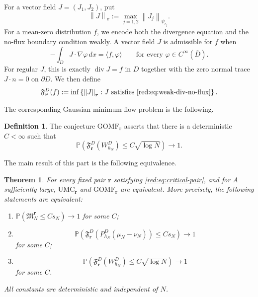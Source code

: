 \documentclass[11pt]{article}
\newtheorem{theorem}{Theorem}[section]
\theoremstyle{definition}
\newtheorem{definition}[definition]{Definition}
\theoremstyle{remark}
\numberwithin{equation}{section}
\newcommand{\Pp}{\mathbb P}
\newcommand{\divv}{\operatorname{div}}
\newcommand{\norm}[1]{\left\|#1\right\|}
\newcommand{\set}[1]{\left\{#1\right\}}
\newcommand{\pa}[1]{\left(#1\right)}
\begin{document}
For a vector field $J=(J_1,J_2)$, put
\begin{equation}
 \norm J_{\boldsymbol r}
 :=\max_{j=1,2}\norm{J_j}_{\psi_{r_j}}.
 \label{red:eq:product-flow-norm}
\end{equation}
For a mean-zero distribution $f$, we encode both the divergence equation
and the no-flux boundary condition weakly.  A vector field $J$ is admissible
for $f$ when
\begin{equation}
 -\int_D J\cdot\nabla\varphi\,dx=\langle f,\varphi\rangle
 \qquad\text{for every }\varphi\in C^\infty(\overline D).
 \label{red:eq:weak-div-no-flux}
\end{equation}
For regular $J$, this is exactly $\divv J=f$ in $D$ together with the zero
normal trace $J\cdot n=0$ on $\partial D$.  We then define
\begin{equation}
 \mathfrak F_{\boldsymbol r}^{D}(f)
 :=\inf\set{\norm J_{\boldsymbol r}: J\text{ satisfies }
 \eqref{red:eq:weak-div-no-flux}}.
 \label{red:eq:aniso-flow}
\end{equation}

The corresponding Gaussian minimum-flow problem is the following.

\begin{definition}
\label{red:def:GOMF}
The conjecture $\mathrm{GOMF}_{\boldsymbol r}$ asserts that there is a
deterministic $C<\infty$ such that
\begin{equation}
 \Pp\pa{\mathfrak F_{\boldsymbol r}^{D}(W_{h_N}^{D})
 \le C\sqrt{\log N}}\longrightarrow1.
 \label{red:eq:GOMF}
\end{equation}
\end{definition}

The main result of this part is the following equivalence.

\begin{theorem}
\label{red:thm:main}
For every fixed pair $\boldsymbol r$ satisfying
\eqref{red:eq:critical-pair}, and for $A$ sufficiently large,
$\mathrm{UMC}_{\boldsymbol r}$ and
$\mathrm{GOMF}_{\boldsymbol r}$ are equivalent.  More precisely, the
following statements are equivalent:
\begin{enumerate}[label=\textnormal{(\roman*)}]
 \item $\Pp(\mathfrak M_N^{\boldsymbol r}\le Cs_N)\to1$ for some $C$;
 \item
 \[
 \Pp\pa{\mathfrak F_{\boldsymbol r}^{D}
 (P_{h_N}^D(\mu_N-\nu_N))\le Cs_N}\to1
 \]
 for some $C$;
 \item
 \[
 \Pp\pa{\mathfrak F_{\boldsymbol r}^{D}(W_{h_N}^{D})
 \le C\sqrt{\log N}}\to1
 \]
 for some $C$.
\end{enumerate}
All constants are deterministic and independent of $N$.
\end{theorem}
\end{document}
